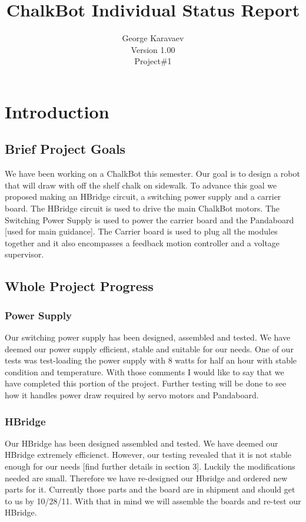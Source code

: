 \documentclass[12pt]{article}
\title{ChalkBot Individual Status Report}
\author{George Karavaev\\ \normalsize Version 1.00 \\Project\#1}
\begin{document}
  \maketitle 
 \newpage
 \tableofcontents
 \listoffigures
\newpage
 \section{Introduction}
 \subsection{Brief Project Goals}
 We have been working on a ChalkBot this semester. Our goal is to design a robot that will draw with off the shelf chalk on sidewalk. To advance this goal we proposed making an HBridge circuit, a switching power supply and a carrier board. The HBridge circuit is used to drive the main ChalkBot motors. The Switching Power Supply is used to power the carrier board and the Pandaboard [used for main guidance]. The Carrier board is used to plug all the modules together and it also encompasses a feedback motion controller and a voltage supervisor.
\subsection{Whole Project Progress}
\subsubsection{Power Supply}
Our switching power supply has been designed, assembled and tested. We have deemed our power supply efficient, stable and suitable for our needs. One of our tests was test-loading the power supply with 8 watts for half an hour with stable condition and temperature. With those comments I would like to say that we have completed this portion of the project. Further testing will be done to see how it handles power draw required by servo motors and Pandaboard.
\subsubsection{HBridge}
Our HBridge has been designed assembled and tested. We have deemed our HBridge extremely efficienct. However, our testing revealed that it is not stable enough for our needs [find further details in section 3]. Luckily the modifications needed are small. Therefore we have re-designed our Hbridge and ordered new parts for it. Currently those parts and the board are in shipment and should get to us by 10/28/11. With that in mind we will assemble the boards and re-test our HBridge. 
\end{document}
